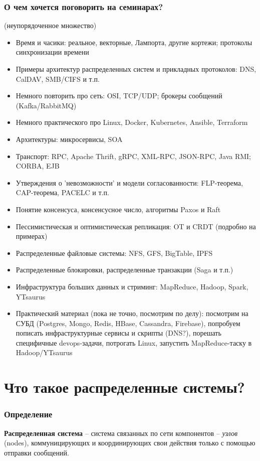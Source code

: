 \documentclass{beamer}
\begin{document}
\begin{frame}
\frametitle{О чем хочется поговорить на семинарах?}

(неупорядоченное множество)

\begin{itemize}
  \tiny
	\item Время и часики: реальное, векторные, Лампорта, другие кортежи; протоколы синхронизации времени
	\item Примеры архитектур распределенных систем и прикладных протоколов: DNS, CalDAV, SMB/CIFS и т.п.
  \item Немного повторить про сеть: OSI, TCP/UDP; брокеры сообщений (Kafka/RabbitMQ)
	\item Немного практического про Linux, Docker, Kubernetes, Ansible, Terraform
	\item Архитектуры: микросервисы, SOA
	\item Транспорт: RPC, Apache Thrift, gRPC, XML-RPC, JSON-RPC, Java RMI; CORBA, EJB
	\item Утверждения о 'невозможности' и модели согласованности: FLP-теорема, CAP-теорема, PACELC и т.п.
	\item Понятие консенсуса, консенсусное число, алгоритмы Paxos и Raft
	\item Пессимистическая и оптимистическая репликация: OT и CRDT (подробно на примерах)
	\item Распределенные файловые системы: NFS, GFS, BigTable, IPFS
	\item Распределенные блокировки, распределенные транзакции (Saga и т.п.)
	\item Инфраструктура больших данных и стриминг: MapReduce, Hadoop, Spark, YTsaurus
	\item Практический материал (пока не точно, посмотрим по делу): посмотрим на СУБД (Postgres, Mongo, Redis, HBase, Cassandra, Firebase), попробуем пописать инфраструктурные сервисы и скрипты (DNS?), порешать специфичные devops-задачи, потрогать Linux, запустить MapReduce-таску в Hadoop/YTsaurus
\end{itemize}

\end{frame}

\section{Что такое распределенные системы?}

\begin{frame}
  \frametitle{Определение}

  {\bfseries Распределенная система} – система связанных по сети компонентов – {\itshape узлов} (nodes), коммуницирующих
  и координирующих свои действия только с помощью отправки сообщений.

\end{frame}
\end{document}
